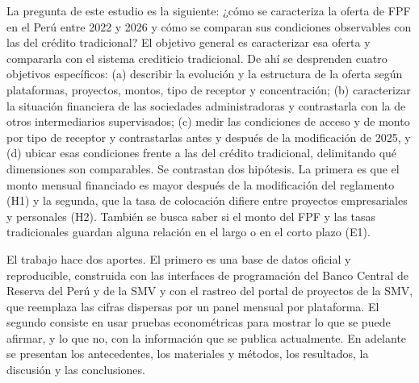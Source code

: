 La pregunta de este estudio es la siguiente: ¿cómo se caracteriza la oferta de FPF en el Perú entre 2022 y 2026 y cómo se comparan sus condiciones observables con las del crédito tradicional? El objetivo general es caracterizar esa oferta y compararla con el sistema crediticio tradicional. De ahí se desprenden cuatro objetivos específicos: (a) describir la evolución y la estructura de la oferta según plataformas, proyectos, montos, tipo de receptor y concentración; (b) caracterizar la situación financiera de las sociedades administradoras y contrastarla con la de otros intermediarios supervisados; (c) medir las condiciones de acceso y de monto por tipo de receptor y contrastarlas antes y después de la modificación de 2025, y (d) ubicar esas condiciones frente a las del crédito tradicional, delimitando qué dimensiones son comparables. Se contrastan dos hipótesis. La primera es que el monto mensual financiado es mayor después de la modificación del reglamento (H1) y la segunda, que la tasa de colocación difiere entre proyectos empresariales y personales (H2). También se busca saber si el monto del FPF y las tasas tradicionales guardan alguna relación en el largo o en el corto plazo (E1).

El trabajo hace dos aportes. El primero es una base de datos oficial y reproducible, construida con las interfaces de programación del Banco Central de Reserva del Perú y de la SMV y con el rastreo del portal de proyectos de la SMV, que reemplaza las cifras dispersas por un panel mensual por plataforma. El segundo consiste en usar pruebas econométricas para mostrar lo que se puede afirmar, y lo que no, con la información que se publica actualmente. En adelante se presentan los antecedentes, los materiales y métodos, los resultados, la discusión y las conclusiones.

